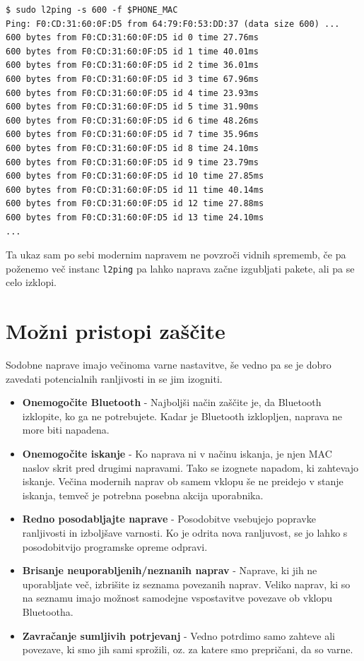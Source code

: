 \documentclass[11pt,a4paper,slovene]{article}
\begin{document}
\begin{verbatim}
$ sudo l2ping -s 600 -f $PHONE_MAC
Ping: F0:CD:31:60:0F:D5 from 64:79:F0:53:DD:37 (data size 600) ...
600 bytes from F0:CD:31:60:0F:D5 id 0 time 27.76ms
600 bytes from F0:CD:31:60:0F:D5 id 1 time 40.01ms
600 bytes from F0:CD:31:60:0F:D5 id 2 time 36.01ms
600 bytes from F0:CD:31:60:0F:D5 id 3 time 67.96ms
600 bytes from F0:CD:31:60:0F:D5 id 4 time 23.93ms
600 bytes from F0:CD:31:60:0F:D5 id 5 time 31.90ms
600 bytes from F0:CD:31:60:0F:D5 id 6 time 48.26ms
600 bytes from F0:CD:31:60:0F:D5 id 7 time 35.96ms
600 bytes from F0:CD:31:60:0F:D5 id 8 time 24.10ms
600 bytes from F0:CD:31:60:0F:D5 id 9 time 23.79ms
600 bytes from F0:CD:31:60:0F:D5 id 10 time 27.85ms
600 bytes from F0:CD:31:60:0F:D5 id 11 time 40.14ms
600 bytes from F0:CD:31:60:0F:D5 id 12 time 27.88ms
600 bytes from F0:CD:31:60:0F:D5 id 13 time 24.10ms
...
\end{verbatim}

Ta ukaz sam po sebi modernim napravem ne povzroči vidnih sprememb, če pa poženemo več instanc \texttt{l2ping} pa lahko naprava začne izgubljati pakete, ali pa se celo izklopi.

\section{Možni pristopi zaščite}

Sodobne naprave imajo večinoma varne nastavitve, še vedno pa se je dobro zavedati potencialnih ranljivosti in se jim izogniti.

\begin{itemize}
    \item \textbf{Onemogočite Bluetooth} - Najboljši način zaščite je, da Bluetooth izklopite, ko ga ne potrebujete. Kadar je Bluetooth izklopljen, naprava ne more biti napadena.
    \item \textbf{Onemogočite iskanje} - Ko naprava ni v načinu iskanja, je njen MAC naslov skrit pred drugimi napravami. Tako se izognete napadom, ki zahtevajo iskanje. Večina modernih naprav ob samem vklopu še ne preidejo v stanje iskanja, temveč je potrebna posebna akcija uporabnika.
    \item \textbf{Redno posodabljajte naprave} - Posodobitve vsebujejo popravke ranljivosti in izboljšave varnosti. Ko je odrita nova ranljuvost, se jo lahko s posodobitvijo programske opreme odpravi.
    \item \textbf{Brisanje neuporabljenih/neznanih naprav} - Naprave, ki jih ne uporabljate več, izbrišite iz seznama povezanih naprav. Veliko naprav, ki so na seznamu imajo možnost samodejne vspostavitve povezave ob vklopu Bluetootha.
    \item \textbf{Zavračanje sumljivih potrjevanj} - Vedno potrdimo samo zahteve ali povezave, ki smo jih sami sprožili, oz. za katere smo prepričani, da so varne.
\end{itemize}
\end{document}
